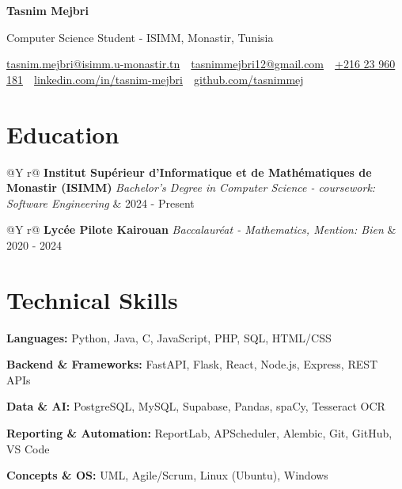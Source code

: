 \documentclass[10pt, a4paper]{article}
\makeatletter
\newcommand{\cvline}[3]{%
    \noindent
    \begin{tabularx}{\linewidth}{@{}Y r@{}}
        \textbf{#1} #2 & \textcolor{accentgray}{\small #3}
    \end{tabularx}
    \par\vspace{1pt}
}
\newcommand{\skillrow}[2]{%
    \noindent\textbf{#1:} \textcolor{medgray}{#2}\par\vspace{1pt}
}
\makeatother
\begin{document}
\pagestyle{empty}


{\centering
    {\LARGE\bfseries Tasnim Mejbri}\par
    \vspace{2pt}
    {\color{medgray} Computer Science Student - ISIMM, Monastir, Tunisia}\par
    \vspace{4pt}
    \small
    \href{mailto:tasnim.mejbri@isimm.u-monastir.tn}{tasnim.mejbri@isimm.u-monastir.tn}
    \textcolor{accentgray}{\,\textbullet\,}
    \href{mailto:tasnimmejbri12@gmail.com}{tasnimmejbri12@gmail.com}
    \textcolor{accentgray}{\,\textbullet\,}
    \href{tel:+21623960181}{+216 23 960 181}
    \textcolor{accentgray}{\,\textbullet\,}
    \href{https://www.linkedin.com/in/tasnim-mejbri-353ba4395/}{linkedin.com/in/tasnim-mejbri}
    \textcolor{accentgray}{\,\textbullet\,}
    \href{https://github.com/tasnimmej}{github.com/tasnimmej}\par
}

\vspace{0.3em}


\section{Education}


\cvline{Institut Sup\'{e}rieur d'Informatique et de Math\'{e}matiques de Monastir (ISIMM)}
        {\textit{\color{medgray}Bachelor's Degree in Computer Science - coursework: Software Engineering}}
        {2024 - Present}

\cvline{Lyc\'{e}e Pilote Kairouan}
        {\textit{\color{medgray}Baccalaur\'{e}at - Mathematics, Mention: Bien}}
        {2020 - 2024}


\section{Technical Skills}

\skillrow{Languages}{Python, Java, C, JavaScript, PHP, SQL, HTML/CSS}
\skillrow{Backend \& Frameworks}{FastAPI, Flask, React, Node.js, Express, REST APIs}
\skillrow{Data \& AI}{PostgreSQL, MySQL, Supabase, Pandas, spaCy, Tesseract OCR}
\skillrow{Reporting \& Automation}{ReportLab, APScheduler, Alembic, Git, GitHub, VS Code}
\skillrow{Concepts \& OS}{UML, Agile/Scrum, Linux (Ubuntu), Windows}
\end{document}
